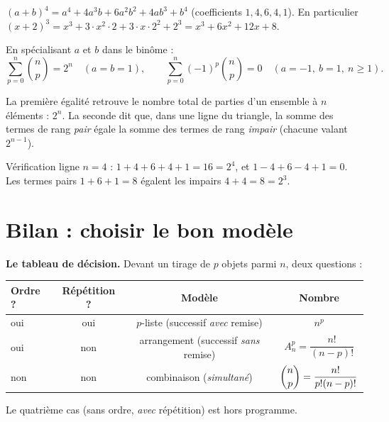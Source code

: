 \begin{exemple}
$(a+b)^{4}=a^{4}+4a^{3}b+6a^{2}b^{2}+4ab^{3}+b^{4}$ (coefficients $1,4,6,4,1$).
En particulier $(x+2)^{3}=x^{3}+3\cdot x^{2}\cdot 2+3\cdot x\cdot 2^{2}+2^{3}=x^{3}+6x^{2}+12x+8$.
\end{exemple}

\begin{propriete}
En spécialisant $a$ et $b$ dans le binôme :
\[
\sum_{p=0}^{n}\binom np=2^{n}\quad(a=b=1),\qquad
\sum_{p=0}^{n}(-1)^{p}\binom np=0\quad(a=-1,\ b=1,\ n\ge1).
\]
\end{propriete}

\begin{remarque}
La première égalité retrouve le nombre total de parties d'un ensemble à $n$ éléments :
$2^{n}$. La seconde dit que, dans une ligne du triangle, la somme des termes de rang
\emph{pair} égale la somme des termes de rang \emph{impair} (chacune valant $2^{n-1}$).
\end{remarque}

\begin{exemple}
Vérification ligne $n=4$ : $1+4+6+4+1=16=2^{4}$, et $1-4+6-4+1=0$. Les termes pairs
$1+6+1=8$ égalent les impairs $4+4=8=2^{3}$.
\end{exemple}

\section{Bilan : choisir le bon modèle}

\begin{aretenir}
\textbf{Le tableau de décision.} Devant un tirage de $p$ objets parmi $n$, deux questions :
\begin{center}\small
\begin{tabular}{@{}lccc@{}}
\toprule
\textbf{Ordre ?} & \textbf{Répétition ?} & \textbf{Modèle} & \textbf{Nombre}\\
\midrule
oui & oui & $p$-liste (successif \emph{avec} remise) & $n^{p}$\\
oui & non & arrangement (successif \emph{sans} remise) & $A_n^{p}=\dfrac{n!}{(n-p)!}$\\
non & non & combinaison (\emph{simultané}) & $\dbinom np=\dfrac{n!}{p!(n-p)!}$\\
\bottomrule
\end{tabular}
\end{center}
Le quatrième cas (sans ordre, \emph{avec} répétition) est hors programme.
\end{aretenir}

